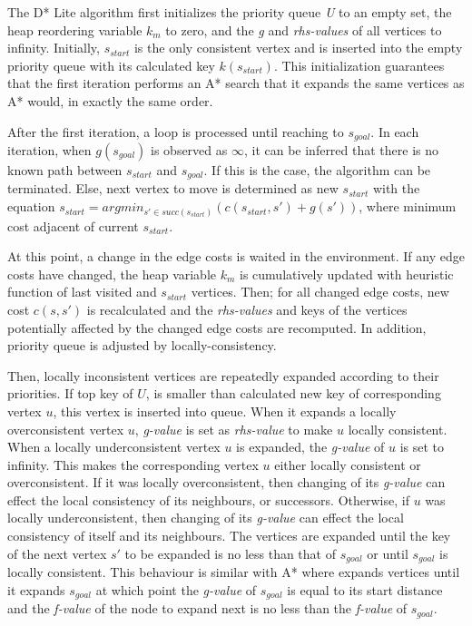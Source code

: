 \documentclass[10pt,journal]{IEEEtran}
\begin{document}
The D* Lite algorithm first initializes the priority queue \textit{U} to an empty set, the heap reordering variable $k_{m}$ to zero, and the \textit{g} and \textit{rhs-values} of all vertices to infinity. Initially, $s_{start}$ is the only consistent vertex and is inserted into the empty priority queue with its calculated key $k(s_{start})$. This initialization guarantees that the first iteration performs an A* search that it expands the same vertices as A* would, in exactly the same order.

After the first iteration, a loop is processed until reaching to $s_{goal}$. In each iteration, when $g(s_{goal})$ is observed as $\infty$, it can be inferred that there is no known path between $s_{start}$ and $s_{goal}$. If this is the case, the algorithm can be terminated. Else, next vertex to move is determined as new $s_{start}$ with the equation $s_{start} = argmin_{s' \in succ(s_{start})}(c(s_{start},s') + g(s'))$, where minimum cost adjacent of current $s_{start}$.

At this point, a change in the edge costs is waited in the environment. If any edge costs have changed, the heap variable $k_{m}$ is cumulatively updated with heuristic function of last visited and $s_{start}$ vertices. Then; for all changed edge costs, new cost $c(s, s')$ is recalculated and the \textit{rhs-values} and keys of the vertices potentially affected by the changed edge costs are recomputed. In addition, priority queue is adjusted by locally-consistency. 

Then, locally inconsistent vertices are repeatedly expanded according to their priorities. If top key of $U$, is smaller than calculated new key of corresponding vertex $u$, this vertex is inserted into queue. When it expands a locally overconsistent vertex $u$, \textit{g-value} is set as \textit{rhs-value} to make $u$ locally consistent. When a locally underconsistent vertex $u$ is expanded, the \textit{g-value} of $u$ is set to infinity. This makes the corresponding vertex $u$ either locally consistent or overconsistent. If it was locally overconsistent, then changing of its \textit{g-value} can effect the local consistency of its neighbours, or successors. Otherwise, if $u$ was locally underconsistent, then changing of its \textit{g-value} can effect the local consistency of itself and its neighbours. The vertices are expanded until the key of the next vertex $s'$ to be expanded is no less than that of $s_{goal}$ or until $s_{goal}$ is locally consistent. This behaviour is similar with A* where expands vertices until it expands $s_{goal}$ at which point the \textit{g-value} of $s_{goal}$ is equal to its start distance and the \textit{f-value} of the node to expand next is no less than the \textit{f-value} of $s_{goal}$.
\end{document}

